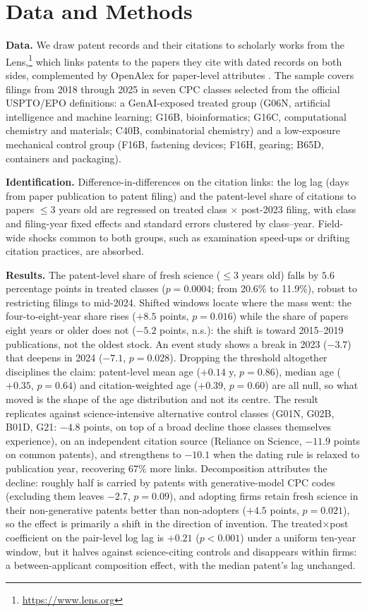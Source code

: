 \documentclass[
]{ceurart}
\begin{document}
\section{Data and Methods}

\textbf{Data.} We draw patent records and their citations to scholarly works from the Lens,\footnote{\url{https://www.lens.org}} which links patents to the papers they cite with dated records on both sides, complemented by OpenAlex for paper-level attributes \cite{priem2022openalex}. The sample covers filings from 2018 through 2025 in seven CPC classes selected from the official USPTO/EPO definitions: a GenAI-exposed treated group (G06N, artificial intelligence and machine learning; G16B, bioinformatics; G16C, computational chemistry and materials; C40B, combinatorial chemistry) and a low-exposure mechanical control group (F16B, fastening devices; F16H, gearing; B65D, containers and packaging).

\textbf{Identification.} Difference-in-differences on the citation links: the log lag (days from paper publication to patent filing) and the patent-level share of citations to papers $\le$3 years old are regressed on treated class $\times$ post-2023 filing, with class and filing-year fixed effects and standard errors clustered by class--year. Field-wide shocks common to both groups, such as examination speed-ups or drifting citation practices, are absorbed.

\textbf{Results.} The patent-level share of fresh science ($\le$3 years old) falls by $5.6$ percentage points in treated classes ($p=0.0004$; from 20.6\% to 11.9\%), robust to restricting filings to mid-2024. Shifted windows locate where the mass went: the four-to-eight-year share rises ($+8.5$ points, $p=0.016$) while the share of papers eight years or older does not ($-5.2$ points, n.s.): the shift is toward 2015--2019 publications, not the oldest stock. An event study shows a break in 2023 ($-3.7$) that deepens in 2024 ($-7.1$, $p=0.028$). Dropping the threshold altogether disciplines the claim: patent-level mean age ($+0.14$ y, $p=0.86$), median age ($+0.35$, $p=0.64$) and citation-weighted age ($+0.39$, $p=0.60$) are all null, so what moved is the shape of the age distribution and not its centre. The result replicates against science-intensive alternative control classes (G01N, G02B, B01D, G21: $-4.8$ points, on top of a broad decline those classes themselves experience), on an independent citation source (Reliance on Science, $-11.9$ points on common patents), and strengthens to $-10.1$ when the dating rule is relaxed to publication year, recovering 67\% more links. Decomposition attributes the decline: roughly half is carried by patents with generative-model CPC codes (excluding them leaves $-2.7$, $p=0.09$), and adopting firms retain fresh science in their non-generative patents better than non-adopters ($+4.5$ points, $p=0.021$), so the effect is primarily a shift in the direction of invention. The treated$\times$post coefficient on the pair-level log lag is $+0.21$ ($p<0.001$) under a uniform ten-year window, but it halves against science-citing controls and disappears within firms: a between-applicant composition effect, with the median patent's lag unchanged.
\end{document}
